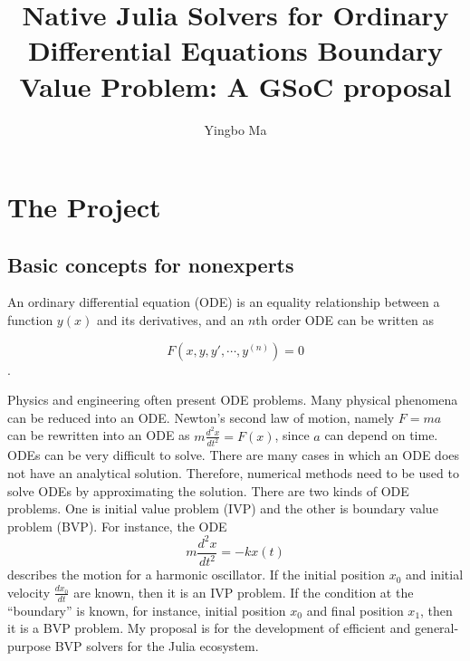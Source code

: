 \documentclass[a4paper,12pt,onecolumn]{article}
\author{Yingbo Ma}
\title{Native Julia Solvers for Ordinary Differential Equations Boundary Value Problem: A GSoC proposal}
\begin{document}
\maketitle
\maketitle
\tableofcontents



\section{The Project} %
\label{sec:the_project}

\subsection{Basic concepts for nonexperts} %
\label{sub:basic_concepts_for_nonexperts}
An ordinary differential equation (ODE)  is an equality relationship between a function $y(x)$
and its derivatives, and an $n$th order ODE can be written as

\[F(x, y, y', \cdots, y^{(n)}) = 0\].

Physics and engineering often present ODE problems. Many physical phenomena can be reduced into an ODE. Newton's second law of motion, namely $F=ma$ can be rewritten into an ODE as $m\frac{d^2x}{dt^2}
=F(x)$, since $a$ can depend on time. ODEs can be very difficult to solve. There are many cases in which an ODE does not have an analytical solution. Therefore, numerical methods need to be used to solve
ODEs by approximating the solution. There are two kinds of ODE problems. One is initial
value problem (IVP) and the other is boundary value problem (BVP). For instance, the ODE
\[m\frac{d^2x}{dt^2} = -kx(t)\]
describes the motion for a harmonic oscillator. If the initial position $x_0$ and initial velocity
$\frac{dx_0}{dt}$ are known, then it is an IVP problem. If the condition at the ``boundary'' is known,
for instance, initial position $x_0$ and final position $x_1$, then it is a BVP problem. My
proposal is for the development of efficient and general-purpose BVP solvers for the Julia
ecosystem.
\end{document}
